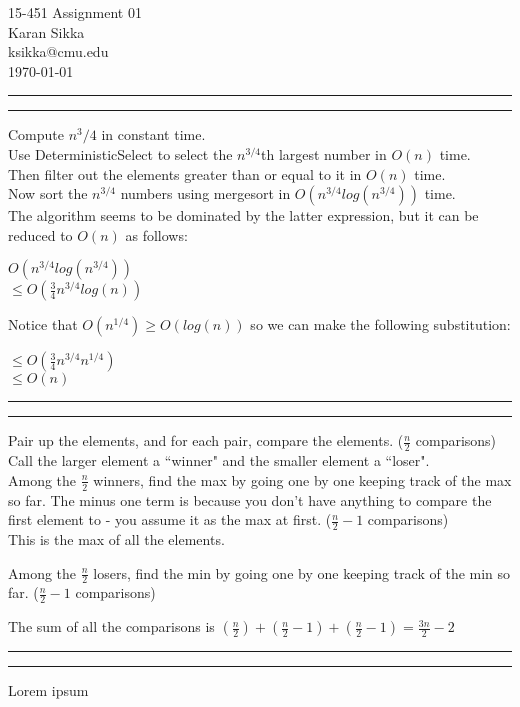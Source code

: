 \documentclass[11pt,letterpaper]{article}
\makeatletter
\newcommand{\question}[1] {\vspace{.25in} \hrule\vspace{0.5em}
\noindent{\bf #1} \vspace{0.5em}
\hrule \vspace{.10in}}
\newcommand{\myname}{Karan Sikka}
\newcommand{\myandrew}{ksikka@cmu.edu}
\newcommand{\myhwnum}{01}
\makeatother
\begin{document}
\medskip

\thispagestyle{plain}
\begin{center}                  %
{\Large 15-451 Assignment \myhwnum} \\
\myname \\
\myandrew \\
\today
\end{center}

\question{1a.}
Compute $n^3/4$ in constant time.\\
Use DeterministicSelect to select the $n^{3/4}$th largest number in $O(n)$ time.\\
Then filter out the elements greater than or equal to it in $O(n)$ time.\\
Now sort the $n^{3/4}$ numbers using mergesort in $O(n^{3/4}log(n^{3/4}))$ time.\\
The algorithm seems to be dominated by the latter expression, but it can be reduced to $O(n)$ as follows:

     $O(n^{3/4}log(n^{3/4}))$ \\
$\leq O(\frac{3}{4} n^{3/4} log(n))$

Notice that $O(n^{1/4}) \geq O(log(n))$ so we can make the following substitution:

$\leq O(\frac{3}{4} n^{3/4} n^{1/4})$ \\
$\leq O(n)$

\question{1b.}
Pair up the elements, and for each pair, compare the elements. ($\frac{n}{2}$ comparisons) \\
Call the larger element a ``winner" and the smaller element a ``loser". \\
Among the $\frac{n}{2}$ winners, find the max by going one by one keeping track of the max so far. The minus one term is because you don't have anything to compare the first element to - you assume it as the max at first. ($\frac{n}{2}-1$ comparisons) \\
This is the max of all the elements.

Among the $\frac{n}{2}$ losers, find the min by going one by one keeping track of the min so far. ($\frac{n}{2}-1$ comparisons)

The sum of all the comparisons is $(\frac{n}{2}) + (\frac{n}{2}-1) + (\frac{n}{2}-1) = \frac{3n}{2}-2 $

\question{2}
Lorem ipsum
\end{document}
